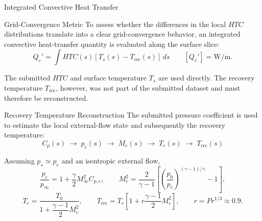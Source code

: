 \begin{frame}[shrink=15]{\small  Integrated Convective Heat Transfer}
\scriptsize

\centering
\vspace{-0.1cm}
\begin{minipage}{0.90\textwidth}
\begin{block}{\scriptsize Grid-Convergence Metric}
To assess whether the differences in the local $HTC$ distributions translate
into a clear grid-convergence behavior, an integrated convective heat-transfer
quantity is evaluated along the surface slice:
\[
\boxed{
Q_c'
=
\int
HTC(s)
\left[
T_s(s)-T_{\mathrm{rec}}(s)
\right]\,ds
}
\qquad
[Q_c'] = \mathrm{W/m}.
\]

The submitted $HTC$ and surface temperature $T_s$ are used directly.
The recovery temperature $T_{\mathrm{rec}}$, however, was not part of the
submitted dataset and must therefore be reconstructed.
\end{block}
\end{minipage}

\vspace{0.15cm}

\begin{minipage}{0.90\textwidth}
\begin{block}{\scriptsize Recovery Temperature Reconstruction}
The submitted pressure coefficient is used to estimate the local external-flow
state and subsequently the recovery temperature:
\[
\boxed{
C_p(s)
\;\longrightarrow\;
p_e(s)
\;\longrightarrow\;
M_e(s)
\;\longrightarrow\;
T_e(s)
\;\longrightarrow\;
T_{\mathrm{rec}}(s)
}
\]

Assuming $p_s \simeq p_e$ and an isentropic external flow,
\[
\frac{p_e}{p_\infty}
=
1+\frac{\gamma}{2}M_\infty^2 C_{p,e},
\qquad
M_e^2
=
\frac{2}{\gamma-1}
\left[
\left(\frac{p_0}{p_e}\right)^{(\gamma-1)/\gamma}-1
\right],
\]
\[
T_e
=
\frac{T_0}
{1+\dfrac{\gamma-1}{2}M_e^2},
\qquad
T_{\mathrm{rec}}
=
T_e
\left[
1+r\frac{\gamma-1}{2}M_e^2
\right],
\qquad
r=Pr^{1/3}\approx0.9.
\]

\end{block}
\end{minipage}

\end{frame}



